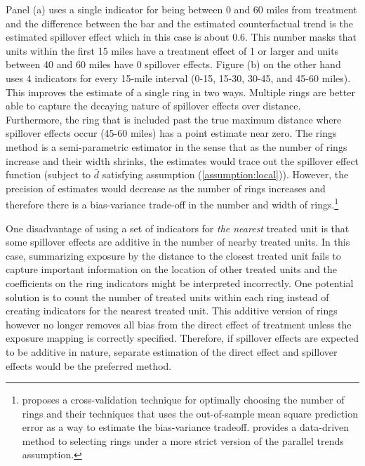 \documentclass[11pt]{article}
\begin{document}
Panel (a) uses a single indicator for being between 0 and 60 miles from treatment and the difference between the bar and the estimated counterfactual trend is the estimated spillover effect which in this case is about 0.6. This number masks that units within the first 15 miles have a treatment effect of 1 or larger and units between 40 and 60 miles have 0 spillover effects. Figure (b) on the other hand uses 4 indicators for every 15-mile interval (0-15, 15-30, 30-45, and 45-60 miles). This improves the estimate of a single ring in two ways. Multiple rings are better able to capture the decaying nature of spillover effects over distance. Furthermore, the ring that is included past the true maximum distance where spillover effects occur (45-60 miles) has a point estimate near zero. The rings method is a semi-parametric estimator in the sense that as the number of rings increase and their width shrinks, the estimates would trace out the spillover effect function (subject to $\bar{d}$ satisfying assumption (\ref{assumption:local})). However, the precision of estimates would decrease as the number of rings increases and therefore there is a bias-variance trade-off in the number and width of rings.\footnote{\citet{Clarke_2017} proposes a cross-validation technique for optimally choosing the number of rings and their techniques that uses the out-of-sample mean square prediction error as a way to estimate the bias-variance tradeoff. \citet{Butts_2021} provides a data-driven method to selecting rings under a more strict version of the parallel trends assumption.} 

One disadvantage of using a set of indicators for \textit{the nearest} treated unit is that some spillover effects are additive in the number of nearby treated units. In this case, summarizing exposure by the distance to the closest treated unit fails to capture important information on the location of other treated units and the coefficients on the ring indicators might be interpreted incorrectly. One potential solution is to count the number of treated units within each ring instead of creating indicators for the nearest treated unit. This additive version of rings however no longer removes all bias from the direct effect of treatment unless the exposure mapping is correctly specified. Therefore, if spillover effects are expected to be additive in nature, separate estimation of the direct effect and spillover effects would be the preferred method. 

\end{document}
